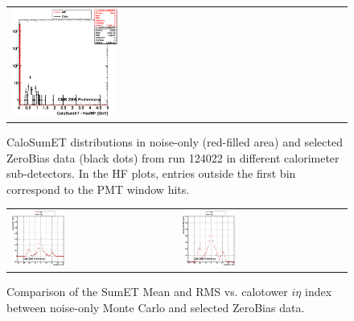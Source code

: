 \begin{figure}[h!]
\begin{tabular}{ll}
  \includegraphics[width=0.33\textwidth]{plots_CaloNoise/h_caloSumetHadHF.eps} \\
 \end{tabular}
 \caption{\small CaloSumET distributions in noise-only (red-filled area) and selected ZeroBias data (black dots) from
run 124022 in different calorimeter sub-detectors. In the HF plots, entries outside the first bin correspond to the PMT
window hits.\label{fig:subdet_CaloSumET}}
\end{figure}

\begin{figure}[h!]
 \centering
 \begin{tabular}{ll}
  \includegraphics[width=0.33\textwidth]{plots_CaloNoise/g_caloSumetMean_vs_ieta_ZB.eps} &
  \includegraphics[width=0.33\textwidth]{plots_CaloNoise/g_caloSumetRMS_vs_ieta_ZB.eps} \\
 \end{tabular}
 \caption{\small Comparison of the SumET Mean and RMS vs. calotower $i\eta$ index between noise-only
          Monte Carlo and selected ZeroBias data.\label{fig:SumET_MeanRMS_vs_ieta_ZB}}
\end{figure}

\clearpage
